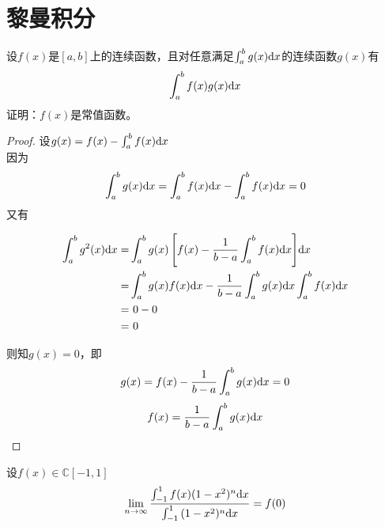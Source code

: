\section{黎曼积分}

\begin{proposition}
    
    设$f(x)$是$[a,b]$上的连续函数，且对任意满足$\int_{a}^{b}{g(x)}\mathrm{d} x$的连续函数$g(x)$有
    $$\int_{a}^{b}{f(x)g(x)}\mathrm{d} x$$
    证明：$f(x)$是常值函数。

\end{proposition}

\begin{proof}

    设$g(x) = f(x) - \int_{a}^{b}{f(x)}\mathrm{d} x$\\
    因为
    $$\int_{a}^{b}{g(x)}\mathrm{d} x = \int_{a}^{b}{f(x)}\mathrm{d} x - \int_{a}^{b}{f(x)}\mathrm{d} x = 0$$
    又有
    
    \begin{align*}
        \int_{a}^{b}{g^2(x)}\mathrm{d} x = & \int_{a}^{b}{g(x)\left[ f(x) - \dfrac{1}{b-a} \int_{a}^{b}{f(x)}\mathrm{d} x \right]}\mathrm{d} x \\
        = & \int_{a}^{b}{g(x)f(x)}\mathrm{d} x - \dfrac{1}{b-a} \int_{a}^{b}{g(x)}\mathrm{d} x \int_{a}^{b}{f(x)}\mathrm{d} x \\
        = & \ 0 - 0 \\
        = & \  0
    \end{align*}
    
    则知$g(x) = 0$，即
    $$g(x) = f(x) - \dfrac{1}{b-a} \int_{a}^{b}{g(x)}\mathrm{d} x = 0$$
    $$f(x) = \dfrac{1}{b-a} \int_{a}^{b}{g(x)}\mathrm{d} x $$

\end{proof}

\begin{proposition}

    设$f(x) \in \mathbb{C}[-1,1]$
    $$\lim_{n\to\infty}{\dfrac{\int_{-1}^{1}{f(x)(1 - x^2)^n}\mathrm{d} x}{\int_{-1}^{1}{(1 - x^2)^n}\mathrm{d} x}} = f(0)$$

\end{proposition}


